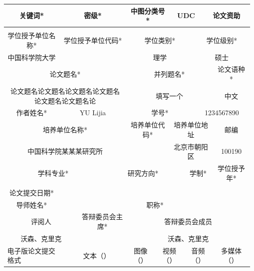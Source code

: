 \documentclass[a4paper,12pt,oneside,openany]{book}
\begin{document}
\begin{CJK}{UTF8}{hei}
\begin{table}[tbph]
\centering{}%
\begin{tabular}{|ccccccccccc|c|ccc|cc|c||c|c||c||c||c|c|cccc|cc|c|ccccc|cc|c|cccc|cc|ccc|c|ccc|cccc|cccc|}
\hline 
\multicolumn{12}{|c|}{关键词{*}} & \multicolumn{12}{c|}{密级{*}} & \multicolumn{12}{c|}{中图分类号{*}} & \multicolumn{12}{c|}{UDC} & \multicolumn{12}{c|}{论文资助}\tabularnewline
\hline 
\multicolumn{12}{|c|}{} & \multicolumn{12}{c|}{} & \multicolumn{12}{c|}{} & \multicolumn{12}{c|}{} & \multicolumn{12}{c|}{}\tabularnewline
\hline 
\multicolumn{15}{|c|}{学位授予单位名称{*}} & \multicolumn{15}{c|}{学位授予单位代码{*}} & \multicolumn{15}{c|}{学位类别{*}} & \multicolumn{15}{c|}{学位级别{*}}\tabularnewline
\hline 
\multicolumn{15}{|c|}{中国科学院大学 } & \multicolumn{15}{c|}{} & \multicolumn{15}{c|}{理学 } & \multicolumn{15}{c|}{硕士 }\tabularnewline
\hline 
\multicolumn{30}{|c|}{论文题名{*}} & \multicolumn{22}{c|}{并列题名{*}} & \multicolumn{8}{c|}{论文语种{*}}\tabularnewline
\hline 
\multicolumn{30}{|c|}{{\scriptsize 论文题名论文题名论文题名论文题名论文题名论文题名论}} & \multicolumn{22}{c|}{{\footnotesize 填写一个}} & \multicolumn{8}{c|}{中文 }\tabularnewline
\hline 
\multicolumn{15}{|c|}{作者姓名{*}} & \multicolumn{15}{c|}{YU Lijia} & \multicolumn{15}{c|}{学号{*}} & \multicolumn{15}{c|}{1234567890}\tabularnewline
\hline 
\multicolumn{24}{|c|}{培养单位名称{*} } & \multicolumn{12}{c|}{培养单位代码{*}} & \multicolumn{20}{c|}{培养单位地址} & \multicolumn{4}{c|}{邮编}\tabularnewline
\hline 
\multicolumn{24}{|c|}{{\footnotesize 中国科学院某某某研究所}} & \multicolumn{12}{c|}{} & \multicolumn{20}{c|}{{\scriptsize 北京市朝阳区}} & \multicolumn{4}{c|}{{\scriptsize 100190}}\tabularnewline
\hline 
\multicolumn{23}{|c|}{学科专业{*}} & \multicolumn{20}{c|}{研究方向{*}} & \multicolumn{6}{c|}{学制{*}} & \multicolumn{11}{c|}{学位授予年{*} }\tabularnewline
\hline 
\multicolumn{23}{|c|}{} & \multicolumn{20}{c|}{} & \multicolumn{6}{c|}{} & \multicolumn{11}{c|}{}\tabularnewline
\hline 
\multicolumn{15}{|c|}{论文提交日期{*}} & \multicolumn{45}{c|}{}\tabularnewline
\hline 
\multicolumn{11}{|c|}{导师姓名{*}} & \multicolumn{20}{c|}{} & \multicolumn{8}{c|}{职称{*}} & \multicolumn{21}{c|}{}\tabularnewline
\hline 
\multicolumn{17}{|c|}{评阅人} & \multicolumn{11}{c|}{{\footnotesize 答辩委员会主席{*}}} & \multicolumn{32}{c|}{答辩委员会成员}\tabularnewline
\hline 
\multicolumn{17}{|c|}{{\scriptsize 沃森、克里克}} & \multicolumn{11}{c|}{} & \multicolumn{32}{c|}{{\scriptsize 沃森、克里克}}\tabularnewline
\hline 
\multicolumn{15}{|l}{电子版论文提交格式} &  & \multicolumn{8}{c}{文本（\quad{}）} & \multicolumn{9}{c}{图像（\quad{}）} & \multicolumn{9}{c}{视频（\quad{}）} & \multicolumn{9}{c}{音频（\quad{}）} & \multicolumn{9}{c|}{多媒体（\quad{}）}\tabularnewline

\end{tabular}
\end{table}
\end{CJK}
\end{document}
